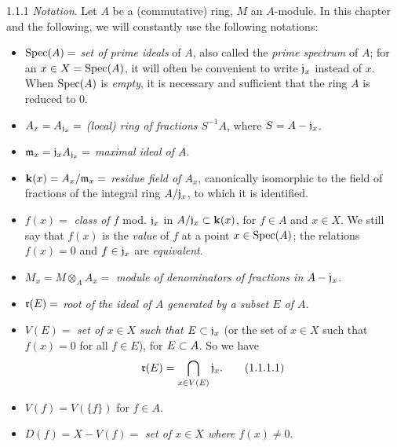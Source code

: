 \documentclass[../main.tex]{subfiles}
\begin{document}
\begin{cx}{1.1.1}
\emph{Notation}. Let $A$ be a (commutative) ring, $M$ an $A$-module. In
this chapter and the following, we will constantly use the following notations:
\begin{itemize}
  \item[] $\operatorname{Spec}(A)=$ \emph{set of prime ideals} of $A$, also called the
          \emph{prime spectrum} of $A$; for an $x\in X=\operatorname{Spec}(A)$, it will often be
          convenient to write $\mathfrak{j}_x$ instead of $x$. When $\operatorname{Spec}(A)$ is
          \emph{empty}, it is necessary and sufficient that the ring $A$ is
          reduced to $0$.
  \item[] $A_x=A_{\mathfrak{j}_x}=$ \emph{(local) ring of fractions $S^{-1}A$},
          where $S=A-\mathfrak{j}_x$.
  \item[] $\mathfrak{m}_x=\mathfrak{j}_x A_{\mathfrak{j}_x}=$ \emph{maximal ideal of $A$}.
  \item[] $\mathbf{k}(x)=A_x/\mathfrak{m}_x=$ \emph{residue field of $A_x$},
          canonically isomorphic to the field of fractions
          of the integral ring $A/\mathfrak{j}_x$, to which it is identified.
  \item[] $f(x)=$ \emph{class of $f$} mod. $\mathfrak{j}_x$ in $A/\mathfrak{j}_x\subset\mathbf{k}(x)$,
          for $f\in A$ and $x\in X$. We still say that $f(x)$ is the \emph{value}
          of $f$ at a point $x\in\operatorname{Spec}(A)$; the relations $f(x)=0$ and $f\in\mathfrak{j}_x$ are
          \emph{equivalent}.
  \item[] $M_x=M\otimes_A A_x=$ \emph{module of denominators of fractions in $A-\mathfrak{j}_x$}.
  \item[] $\mathfrak{r}(E)=$ \emph{root of the ideal of $A$ generated by a subset $E$ of $A$}.
  \item[] $V(E)=$ \emph{set of $x\in X$ such that $E\subset\mathfrak{j}_x$} (or the set of $x\in X$
          such that $f(x)=0$ for all $f\in E$), for $E\subset A$. So we have
          \begin{equation}
            \mathfrak{r}(E)=\bigcap_{x\in V(E)}\mathfrak{j}_x.\tag{1.1.1.1}
          \end{equation}
  \item[] $V(f)=V(\{f\})$ for $f\in A$.
  \item[] $D(f)=X-V(f)=$ \emph{set of $x\in X$ where $f(x)\neq 0$}.
\end{itemize}
\end{cx}
\end{document}
